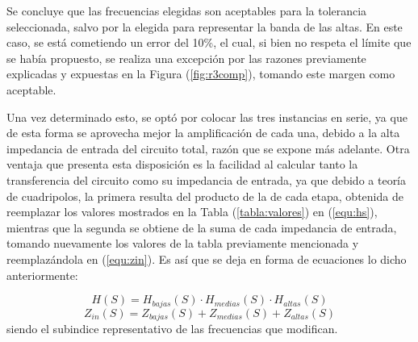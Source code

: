 Se concluye que las frecuencias elegidas son aceptables para la tolerancia seleccionada, salvo por la elegida para representar la banda de las altas. En este caso, se está cometiendo un error del 10\%, el cual, si bien no respeta el límite que se había propuesto, se realiza una excepción por las razones previamente explicadas y expuestas en la Figura (\ref{fig:r3comp}), tomando este margen como aceptable. 

Una vez determinado esto, se optó por colocar las tres instancias en serie, ya que de esta forma se aprovecha mejor la amplificación de cada una, debido a la alta impedancia de entrada del circuito total, razón que se expone más adelante. Otra ventaja que presenta esta disposición es la facilidad al calcular tanto la transferencia del circuito como su impedancia de entrada, ya que debido a teoría de cuadripolos, la primera resulta del producto de la de cada etapa, obtenida de reemplazar los valores mostrados en la Tabla (\ref{tabla:valores}) en (\ref{equ:hs}), mientras que la segunda se obtiene de la suma de cada impedancia de entrada, tomando nuevamente los valores de la tabla previamente mencionada y reemplazándola en (\ref{equ:zin}). Es así que se deja en forma de ecuaciones lo dicho anteriormente:

\begin{equation}
	H(S) = H_{bajas}(S) \cdot H_{medias}(S) \cdot H_{altas}(S)
\end{equation}
\begin{equation}
	Z_{in}(S) = Z_{bajas}(S) + Z_{medias}(S) + Z_{altas}(S)
\end{equation}
siendo el subindice representativo de las frecuencias que modifican.

